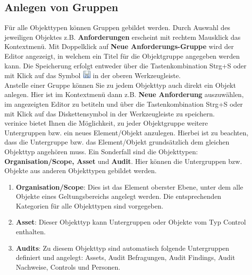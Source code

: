 \documentclass[a4paper,10pt]{book}
\begin{document}
\subsection{Anlegen von Gruppen}
Für alle Objekttypen können Gruppen gebildet werden. Durch Auswahl des jeweiligen Objektes z.B. \textbf{Anforderungen} erscheint mit rechtem
Mausklick das Kontextmenü. Mit Doppelklick auf \textbf{Neue Anforderungs-Gruppe} wird der Editor angezeigt, in welchem ein Titel für die
Objektgruppe angegeben werden kann. Die Speicherung erfolgt entweder über die Tastenkombination Strg+S oder mit Klick auf das Symbol
\includegraphics[height=2ex]{Icon/Disk.png} in der oberen Werkzeugleiste.
\newline\\
Anstelle einer Gruppe können Sie zu jedem Objekttyp auch direkt ein Objekt anlegen. Hier ist im Kontextmenü dann z.B. \textbf{Neue Anforderung}
auszuwählen, im angezeigten Editor zu betiteln und über die Tastenkombination Strg+S oder mit Klick auf das Diskettensymbol in der Werkzeugleiste zu speichern.
\newline\\
verinice bietet Ihnen die Möglichkeit, zu jeder Objektgruppe weitere Untergruppen bzw. ein neues Element/Objekt anzulegen.
Hierbei ist zu beachten, dass die Untergruppe bzw. das Element/Objekt grundsätzlich dem gleichen Objekttyp angehören muss.
Ein Sonderfall sind die Objekttypen: \textbf{Organisation/Scope, Asset} und \textbf{Audit}. Hier können die Untergruppen bzw.
Objekte aus anderen Objekttypen gebildet werden.
\begin{enumerate}
\item \textbf{Organisation/Scope}: Dies ist das Element oberster Ebene, unter dem alle Objekte eines Geltungsbereichs angelegt werden.
Die entsprechenden Kategorien für alle Objekttypen sind vorgegeben.
\item \textbf{Asset}: Dieser Objekttyp kann Untergruppen oder Objekte vom Typ Control enthalten.
\item \textbf{Audits}: Zu diesem Objekttyp sind automatisch folgende Untergruppen definiert und angelegt: Assets, Audit Befragungen, Audit Findings, Audit Nachweise, Controls und Personen.
\end{enumerate}
\end{document}
